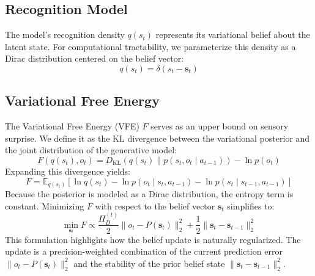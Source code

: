 \subsection{Recognition Model}
The model's recognition density $q(s_t)$ represents its variational belief about the latent state. For computational tractability, we parameterize this density as a Dirac distribution centered on the belief vector:
\begin{equation}
q(s_t) = \delta(s_t - \mathbf{s}_t)
\end{equation}

\subsection{Variational Free Energy}
The Variational Free Energy (VFE) $F$ serves as an upper bound on sensory surprise. We define it as the KL divergence between the variational posterior and the joint distribution of the generative model:
\begin{equation}
F(q(s_t), o_t) = D_{\text{KL}}(q(s_t) \parallel p(s_t, o_t \mid a_{t-1})) - \ln p(o_t)
\end{equation}
Expanding this divergence yields:
\begin{equation}
F = \mathbb{E}_{q(s_t)}[\ln q(s_t) - \ln p(o_t \mid s_t, a_{t-1}) - \ln p(s_t \mid s_{t-1}, a_{t-1})]
\end{equation}
Because the posterior is modeled as a Dirac distribution, the entropy term is constant. Minimizing $F$ with respect to the belief vector $\mathbf{s}_t$ simplifies to:
\begin{equation}
\min_{\mathbf{s}_t} F \propto \frac{\Pi_D^{(t)}}{2} \| o_t - P(\mathbf{s}_t) \|_2^2 + \frac{1}{2} \| \mathbf{s}_t - \mathbf{s}_{t-1} \|_2^2
\end{equation}
This formulation highlights how the belief update is naturally regularized. The update is a precision-weighted combination of the current prediction error $\| o_t - P(\mathbf{s}_t) \|_2^2$ and the stability of the prior belief state $\| \mathbf{s}_t - \mathbf{s}_{t-1} \|_2^2$.

